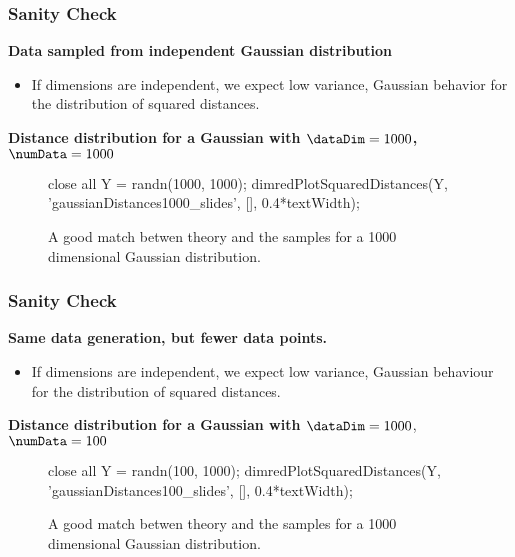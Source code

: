 \begin{frame}[fragile]
  \frametitle{Sanity Check}

  \textbf{Data sampled from independent Gaussian distribution}
  \begin{itemize}
  \item If dimensions are independent, we expect low variance, Gaussian behavior
    for the distribution of squared distances.
  \end{itemize}
  \textbf{Distance distribution for a Gaussian with $\dataDim=1000$,
    $\numData=1000$}

  \begin{figure}
    \begin{matlab}
    close all
    Y = randn(1000, 1000);
    dimredPlotSquaredDistances(Y, 'gaussianDistances1000_slides', [], 0.4*textWidth);
    \end{matlab}
    \begin{center}
    \end{center}

    
    \caption{A good match betwen theory and the samples for a 1000 dimensional
      Gaussian distribution.}
    
  \end{figure}

\end{frame}



\begin{frame}[fragile]
  \frametitle{Sanity Check}

  \textbf{Same data generation, but fewer data points.}
  \begin{itemize}
  \item If dimensions are independent, we expect low variance, Gaussian behaviour
    for the distribution of squared distances.
  \end{itemize}
  \textbf{Distance distribution for a Gaussian with $\dataDim=1000$}, \emph{$\numData=100$}

  \begin{figure}
    \begin{matlab}
    close all
    Y = randn(100, 1000);
    dimredPlotSquaredDistances(Y, 'gaussianDistances100_slides', [], 0.4*textWidth);
    \end{matlab}
    \begin{center}
    \end{center}

    \caption{A good match betwen theory and the samples for a 1000 dimensional
      Gaussian distribution.}

  \end{figure}

\end{frame}

